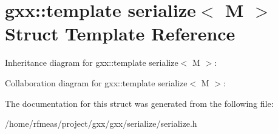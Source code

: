 \hypertarget{structgxx_1_1is__have__serialize_3_01M_00_01T_00_01decltype_07_07void_08_6T_1_1template_01serialize_3_01M_01_4}{}\section{gxx\+:\+:template serialize$<$ M $>$ Struct Template Reference}
\label{structgxx_1_1is__have__serialize_3_01M_00_01T_00_01decltype_07_07void_08_6T_1_1template_01serialize_3_01M_01_4}


Inheritance diagram for gxx\+:\+:template serialize$<$ M $>$\+:


Collaboration diagram for gxx\+:\+:template serialize$<$ M $>$\+:


The documentation for this struct was generated from the following file\+:\begin{DoxyCompactItemize}
\item 
/home/rfmeas/project/gxx/gxx/serialize/serialize.\+h\end{DoxyCompactItemize}
